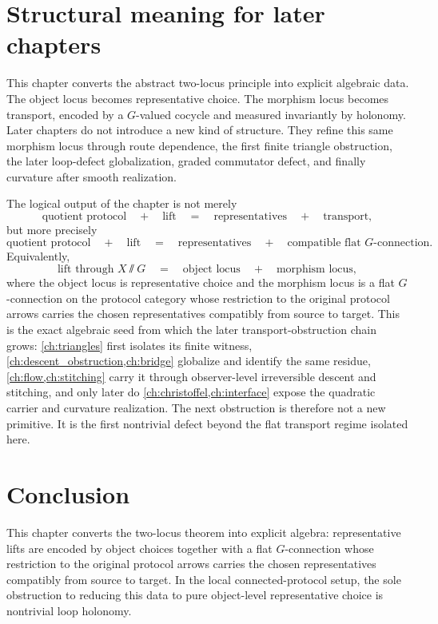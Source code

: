 \section{Structural meaning for later chapters}
\label{sec:lift-meaning}
\begin{remark}
	This chapter converts the abstract two-locus principle into explicit
	algebraic data.
	The object locus becomes representative choice.
	The morphism locus becomes transport, encoded by a \(G\)-valued
	cocycle and measured invariantly by holonomy.
	Later chapters do not introduce a new kind of structure.
	They refine this same morphism locus through route dependence, the
	first finite triangle obstruction, the later loop-defect
	globalization, graded commutator defect, and finally curvature after
	smooth realization.
\end{remark}
\begin{remark}
	The logical output of the chapter is not merely
	\[
		\text{quotient protocol}
		\quad+\quad
		\text{lift}
		\quad=\quad
		\text{representatives}
		\quad+\quad
		\text{transport},
	\]
	but more precisely
	\[
		\text{quotient protocol}
		\quad+\quad
		\text{lift}
		\quad=\quad
		\text{representatives}
		\quad+\quad
		\text{compatible flat }G\text{-connection}.
	\]
	Equivalently,
	\[
		\text{lift through }X\sslash G
		\quad=\quad
		\text{object locus}
		\quad+\quad
		\text{morphism locus},
	\]
	where the object locus is representative choice and the morphism locus
	is a flat \(G\)-connection on the protocol category whose restriction
	to the original protocol arrows carries the chosen representatives
	compatibly from source to target.
	This is the exact algebraic seed from which the later
	transport-obstruction chain grows: \cref{ch:triangles} first isolates
	its finite witness, \cref{ch:descent_obstruction,ch:bridge} globalize
	and identify the same residue, \cref{ch:flow,ch:stitching} carry it
	through observer-level irreversible descent and stitching, and only
	later do \cref{ch:christoffel,ch:interface} expose the quadratic
	carrier and curvature realization.
	The next obstruction is therefore not a new primitive.
	It is the first nontrivial defect beyond the flat transport regime
	isolated here.
\end{remark}

\section{Conclusion}
\label{sec:lift-conclusion}
This chapter converts the two-locus theorem into explicit algebra:
representative lifts are encoded by object choices together with a flat
\(G\)-connection whose restriction to the original protocol arrows
carries the chosen representatives compatibly from source to target.
In the local connected-protocol setup, the sole obstruction to
reducing this data to pure object-level representative choice is
nontrivial loop holonomy.

